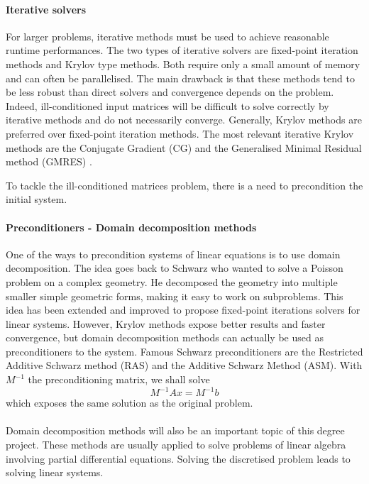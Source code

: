 \paragraph{Iterative solvers}
For larger problems, iterative methods must be used to achieve reasonable runtime performances.
The two types of iterative solvers are fixed-point iteration methods and Krylov type methods.
Both require only a small amount of memory and can often be parallelised.
The main drawback is that these methods tend to be less robust than direct solvers and convergence depends on the problem.
Indeed, ill-conditioned input matrices will be difficult to solve correctly by iterative methods and do not necessarily converge.
Generally, Krylov methods are preferred over fixed-point iteration methods.
The most relevant iterative Krylov methods are the Conjugate Gradient (CG) and the Generalised Minimal Residual method (GMRES) \cite{saad_iterative_2003} \cite{saad_gmres_1986}.

To tackle the ill-conditioned matrices problem, there is a need to precondition the initial system.


\paragraph{Preconditioners - Domain decomposition methods}
One of the ways to precondition systems of linear equations is to use domain decomposition.
The idea goes back to Schwarz who wanted to solve a Poisson problem on a complex geometry.
He decomposed the geometry into multiple smaller simple geometric forms, making it easy to work on subproblems.
This idea has been extended and improved to propose fixed-point iterations solvers for linear systems.
However, Krylov methods expose better results and faster convergence, but domain decomposition methods can actually be used as preconditioners to the system.
Famous Schwarz preconditioners are the Restricted Additive Schwarz method (RAS) and the Additive Schwarz Method (ASM).
With \(M^{-1}\) the preconditioning matrix, we shall solve
\[M^{-1}Ax = M^{-1}b\]
which exposes the same solution as the original problem.

\paragraph{}
Domain decomposition methods will also be an important topic of this degree project.
These methods are usually applied to solve problems of linear algebra involving partial differential equations.
Solving the discretised problem leads to solving linear systems.


